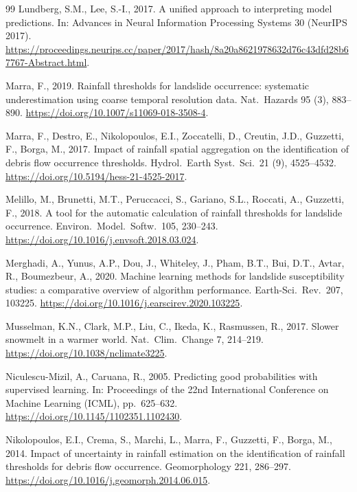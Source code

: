 \documentclass[authoryear,preprint,review,12pt]{elsarticle}
\begin{document}
\begin{thebibliography}{99}
Lundberg, S.M., Lee, S.-I., 2017. A unified approach to interpreting model
predictions. In: Advances in Neural Information Processing Systems 30 (NeurIPS
2017). \url{https://proceedings.neurips.cc/paper/2017/hash/8a20a8621978632d76c43dfd28b67767-Abstract.html}.

Marra, F., 2019. Rainfall thresholds for landslide occurrence: systematic
underestimation using coarse temporal resolution data. Nat.\ Hazards 95 (3),
883--890. \url{https://doi.org/10.1007/s11069-018-3508-4}.

Marra, F., Destro, E., Nikolopoulos, E.I., Zoccatelli, D., Creutin, J.D.,
Guzzetti, F., Borga, M., 2017. Impact of rainfall spatial aggregation on the
identification of debris flow occurrence thresholds. Hydrol.\ Earth Syst.\ Sci.\
21 (9), 4525--4532. \url{https://doi.org/10.5194/hess-21-4525-2017}.

Melillo, M., Brunetti, M.T., Peruccacci, S., Gariano, S.L., Roccati, A.,
Guzzetti, F., 2018. A tool for the automatic calculation of rainfall thresholds
for landslide occurrence. Environ.\ Model.\ Softw.\ 105, 230--243.
\url{https://doi.org/10.1016/j.envsoft.2018.03.024}.

Merghadi, A., Yunus, A.P., Dou, J., Whiteley, J., Pham, B.T., Bui, D.T., Avtar,
R., Boumezbeur, A., 2020. Machine learning methods for landslide susceptibility
studies: a comparative overview of algorithm performance. Earth-Sci.\ Rev.\ 207,
103225. \url{https://doi.org/10.1016/j.earscirev.2020.103225}.

Musselman, K.N., Clark, M.P., Liu, C., Ikeda, K., Rasmussen, R., 2017. Slower
snowmelt in a warmer world. Nat.\ Clim.\ Change 7, 214--219.
\url{https://doi.org/10.1038/nclimate3225}.

Niculescu-Mizil, A., Caruana, R., 2005. Predicting good probabilities with
supervised learning. In: Proceedings of the 22nd International Conference on
Machine Learning (ICML), pp.\ 625--632.
\url{https://doi.org/10.1145/1102351.1102430}.

Nikolopoulos, E.I., Crema, S., Marchi, L., Marra, F., Guzzetti, F., Borga, M.,
2014. Impact of uncertainty in rainfall estimation on the identification of
rainfall thresholds for debris flow occurrence. Geomorphology 221, 286--297.
\url{https://doi.org/10.1016/j.geomorph.2014.06.015}.


\end{thebibliography}
\end{document}
